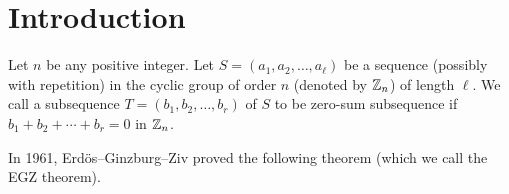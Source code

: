 \documentclass[fleqn]{mat01}
\begin{document}
\begin{abstract}
Let $p$ be any odd prime number. Let $k$ be any positive integer such
that $2\leq k\leq \left[\frac{p+1}3\right]+1$. Let $S =
(a_1,a_2,\ldots,a_{2p-k})$ be any sequence in ${\Bbb Z}_p$ such that
there is no subsequence of length $p$ of $S$ whose sum is zero in $\zp$.
Then we prove that we can arrange the sequence $S$ as follows:
\begin{equation*}
S = (\underbrace{a, a, \ldots, a}_{u \ {\rm times }}, \underbrace{b, b,
\ldots, b}_{v \ {\rm times}}, a_1', a_2', \ldots, a_{2p-k-u-v}')
\end{equation*}
where $u\geq v$, $u+v\geq 2p-2k+2$ and $a-b$ generates $\zp$. This
extends a result in \cite{gao10} to all primes $p$ and $k$ satisfying
$(p+1)/4+3\leq k\leq (p+1)/3+1$. Also, we prove that if $g$ denotes the
number of distinct residue classes modulo $p$ appearing in the sequence
$S$ in $\zp$ of length $2p-k$ $(2\leq k\leq [(p+1)/4]+1)$, and $g\geq
2\sqrt{2}\sqrt{k-2}$, then there exists a subsequence of $S$ of length
$p$ whose sum is zero in $\zp$.
\end{abstract}


\maketitle

\section{Introduction}

Let $n$ be any positive integer. Let $S = (a_1,a_2,\ldots,a_\ell)$ be a
sequence (possibly with repetition) in the cyclic group of order $n$
(denoted by ${\Bbb Z}_n$) of length $\ell$. We call a subsequence $T =
(b_1,b_2,\ldots,b_r)$ of $S$ to be zero-sum subsequence if
$b_1+b_2+\cdots+ b_r = 0$ in ${\Bbb Z}_n$.

In 1961, Erd\"{o}s--Ginzburg--Ziv proved the following theorem (which we
call the EGZ theorem).

\end{document}
